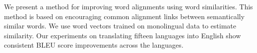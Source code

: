 We present a method for improving word alignments using word similarities. This method is based on encouraging common alignment links between semantically similar words. We use word vectors trained on monolingual data to estimate similarity. Our experiments on translating fifteen languages into English show consistent BLEU score improvements across the languages.
